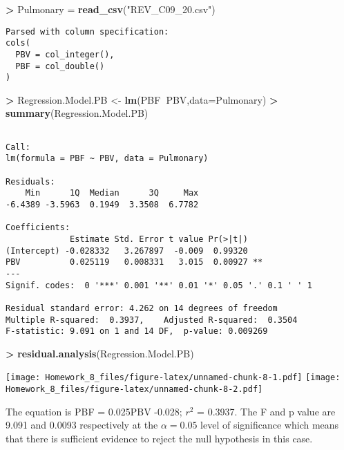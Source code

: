 \documentclass[]{article}
\newenvironment{Shaded}{\begin{snugshade}}{\end{snugshade}}
\newcommand{\KeywordTok}[1]{\textcolor[rgb]{0.13,0.29,0.53}{\textbf{#1}}}
\newcommand{\DataTypeTok}[1]{\textcolor[rgb]{0.13,0.29,0.53}{#1}}
\newcommand{\StringTok}[1]{\textcolor[rgb]{0.31,0.60,0.02}{#1}}
\newcommand{\OperatorTok}[1]{\textcolor[rgb]{0.81,0.36,0.00}{\textbf{#1}}}
\newcommand{\NormalTok}[1]{#1}
\begin{document}
\begin{Shaded}
\begin{Highlighting}[]
\OperatorTok{>}\StringTok{ }\NormalTok{Pulmonary =}\StringTok{ }\KeywordTok{read_csv}\NormalTok{(}\StringTok{"REV_C09_20.csv"}\NormalTok{)}
\end{Highlighting}
\end{Shaded}

\begin{verbatim}
Parsed with column specification:
cols(
  PBV = col_integer(),
  PBF = col_double()
)
\end{verbatim}

\begin{Shaded}
\begin{Highlighting}[]
\OperatorTok{>}\StringTok{ }\NormalTok{Regression.Model.PB <-}\StringTok{ }\KeywordTok{lm}\NormalTok{(PBF}\OperatorTok{~}\NormalTok{PBV,}\DataTypeTok{data=}\NormalTok{Pulmonary)}
\OperatorTok{>}\StringTok{ }\KeywordTok{summary}\NormalTok{(Regression.Model.PB)}
\end{Highlighting}
\end{Shaded}

\begin{verbatim}

Call:
lm(formula = PBF ~ PBV, data = Pulmonary)

Residuals:
    Min      1Q  Median      3Q     Max 
-6.4389 -3.5963  0.1949  3.3508  6.7782 

Coefficients:
             Estimate Std. Error t value Pr(>|t|)   
(Intercept) -0.028332   3.267897  -0.009  0.99320   
PBV          0.025119   0.008331   3.015  0.00927 **
---
Signif. codes:  0 '***' 0.001 '**' 0.01 '*' 0.05 '.' 0.1 ' ' 1

Residual standard error: 4.262 on 14 degrees of freedom
Multiple R-squared:  0.3937,    Adjusted R-squared:  0.3504 
F-statistic: 9.091 on 1 and 14 DF,  p-value: 0.009269
\end{verbatim}

\begin{Shaded}
\begin{Highlighting}[]
\OperatorTok{>}\StringTok{ }\KeywordTok{residual.analysis}\NormalTok{(Regression.Model.PB)}
\end{Highlighting}
\end{Shaded}

\texttt{[image: Homework\_8\_files/figure-latex/unnamed-chunk-8-1.pdf]}
\texttt{[image: Homework\_8\_files/figure-latex/unnamed-chunk-8-2.pdf]}

The equation is PBF = 0.025PBV -0.028; \(r^2\) = 0.3937. The F and p
value are 9.091 and 0.0093 respectively at the \(\alpha = 0.05\) level
of significance which means that there is sufficient evidence to reject
the null hypothesis in this case.
\end{document}
